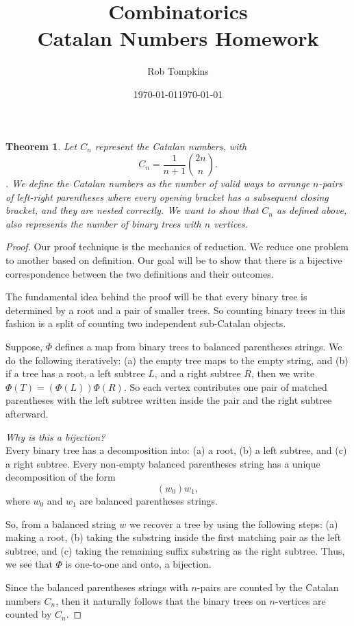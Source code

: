\documentclass[12pt]{amsart}
\title{Combinatorics\\Catalan Numbers Homework}
\author{Rob Tompkins}
\date{\today}
\newtheorem{theorem}{Theorem}
\begin{document}
    \maketitle
    \date{\today}
    \begin{onehalfspace}
        \begin{theorem}
            Let $C_n$ represent the Catalan numbers, with
            \[
                C_n = \frac{1}{n+1}\binom{2n}{n}.
            \].
            We define the Catalan numbers as the number of valid ways to arrange $n$-pairs of left-right
            parentheses where every opening bracket has a subsequent closing bracket, and they are nested correctly.
            We want to show that $C_n$ as defined above, also represents the number of binary trees with $n$ vertices.
        \end{theorem}

        \begin{proof}
            Our proof technique is the mechanics of reduction.
            We reduce one problem to another based on definition.
            Our goal will be to show that there is a bijective correspondence between the two definitions and
            their outcomes.

            The fundamental idea behind the proof will be that every binary tree is determined by a root and a pair
            of smaller trees.
            So counting binary trees in this fashion is a split of counting two independent sub-Catalan objects.

            Suppose, $\Phi$ defines a map from binary trees to balanced parentheses strings.
            We do the following iteratively: (a) the empty tree maps to the empty string, and (b) if a tree has a root,
            a left subtree $L$, and a right subtree $R$, then we write $\Phi(T) = (\Phi(L))\Phi(R)$.
            So each vertex contributes one pair of matched parentheses with the left subtree written inside the pair
            and the right subtree afterward.

            \noindent\emph{Why is this a bijection?}\\

            Every binary tree has a decomposition into: (a) a root, (b) a left subtree, and (c) a right subtree.
            Every non-empty balanced parentheses string has a unique decomposition of the form
            \[
                (w_0)w_1,
            \]
            where $w_0$ and $w_1$ are balanced parentheses strings.

            So, from a balanced string $w$ we recover a tree by using the following steps: (a) making a root, (b) taking
            the substring inside the first matching pair as the left subtree, and (c) taking the remaining suffix
            substring as the right subtree.
            Thus, we see that $\Phi$ is one-to-one and onto, a bijection.

            Since the balanced parentheses strings with $n$-pairs are counted by the Catalan numbers $C_n$, then it
            naturally follows that the binary trees on $n$-vertices are counted by $C_n$.
        \end{proof}
    \end{onehalfspace}
\end{document}
